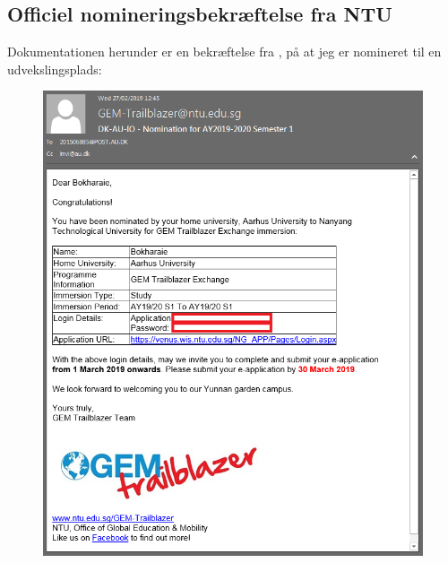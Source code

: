 \documentclass[../Ansoegning.tex]{subfiles}
\begin{document}
\subsection*{Officiel nomineringsbekræftelse fra NTU}
Dokumentationen herunder er en bekræftelse fra \NTU, på at jeg er nomineret til en udvekslingsplads:
\begin{figure}[H]
	\centering
	\includegraphics[width=1\textwidth]{Eksterne_filer/dokumentation3.PNG}
\end{figure}
    \newpage
\end{document}
